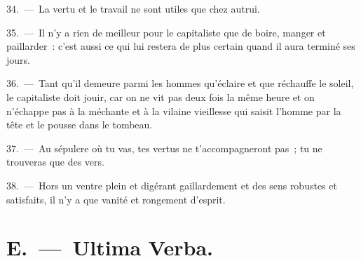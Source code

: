 \documentclass[french,twoside]{book} %
\begin{document}
34. — La vertu et le travail ne sont utiles que chez autrui.\par
35. — Il n’y a rien de meilleur pour le capitaliste que de boire, manger et paillarder : c’est aussi ce qui lui restera de plus certain quand il aura terminé ses jours.\par
36. — Tant qu’il demeure parmi les hommes qu’éclaire et que réchauffe le soleil, le capitaliste doit jouir, car on ne vit pas deux fois la même heure et on n’échappe pas à la méchante et à la vilaine vieillesse qui saisit l’homme par la tête et le pousse dans le tombeau.\par
37. — Au sépulcre où tu vas, tes vertus ne t’accompagneront pas ; tu ne trouveras que des vers.\par
38. — Hors un ventre plein et digérant gaillardement et des sens robustes et satisfaits, il n’y a que vanité et rongement d’esprit.

\section[{E. — Ultima Verba.}]{E. — Ultima Verba.}
\end{document}
